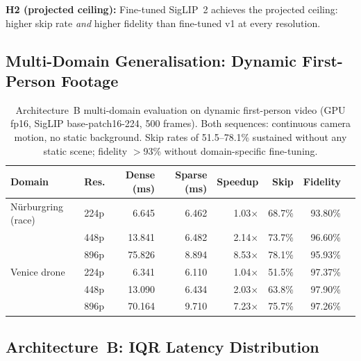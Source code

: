\documentclass{article}
\begin{document}
\textbf{H2 (projected ceiling):} Fine-tuned SigLIP~2 achieves the
projected ceiling: higher skip rate \emph{and} higher fidelity than
fine-tuned v1 at every resolution.

\subsection{Multi-Domain Generalisation: Dynamic First-Person Footage}
\label{sec:multidomain}

\begin{table}[htbp]
\centering
\begin{tabular}{llrrrrrr}
\toprule
\textbf{Domain} & \textbf{Res.} & \textbf{Dense (ms)} & \textbf{Sparse (ms)}
    & \textbf{Speedup} & \textbf{Skip} & \textbf{Fidelity} \\
\midrule
N\"{u}rburgring (race) & 224p &  6.645 & 6.462 & 1.03$\times$ & 68.7\% & 93.80\% \\
                        & 448p & 13.841 & 6.482 & 2.14$\times$ & 73.7\% & 96.60\% \\
                        & 896p & 75.826 & 8.894 & 8.53$\times$ & 78.1\% & 95.93\% \\
\midrule
Venice drone            & 224p &  6.341 & 6.110 & 1.04$\times$ & 51.5\% & 97.37\% \\
                        & 448p & 13.090 & 6.434 & 2.03$\times$ & 63.8\% & 97.90\% \\
                        & 896p & 70.164 & 9.710 & 7.23$\times$ & 75.7\% & 97.26\% \\
\bottomrule
\end{tabular}
\caption{Architecture~B multi-domain evaluation on dynamic first-person
video (GPU fp16, SigLIP base-patch16-224, 500 frames). Both sequences:
continuous camera motion, no static background. Skip rates of 51.5--78.1\%
sustained without any static scene; fidelity $>$93\% without domain-specific
fine-tuning.}
\label{tab:multidomain}
\end{table}

\subsection{Architecture~B: IQR Latency Distribution}
\label{sec:arch-b-iqr}
\end{document}
